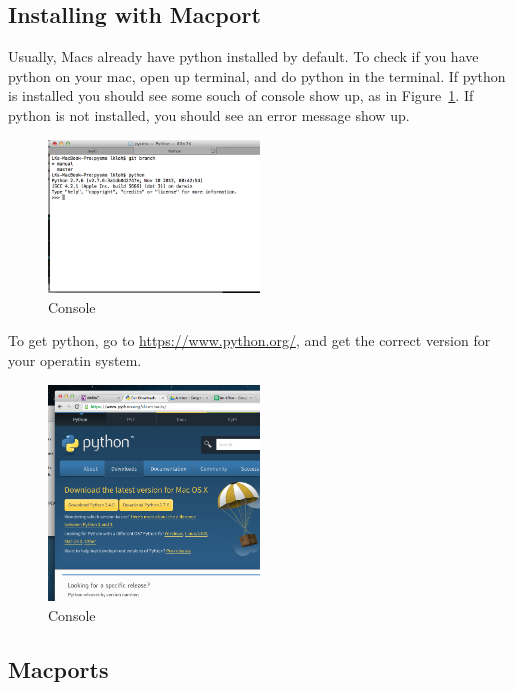 \documentclass[letterpaper,10pt]{article}
\begin{document}
\subsection{Installing with Macport}

Usually, Macs already have python installed by default. To check if you have python on your mac,
open up terminal, and do python in the terminal. If python is installed you should see some souch of console show up, as in Figure~\ref{fig:python_console}. If python is not installed, you should see an error message show up. 

\begin{figure}[h!]
  \centering
  \includegraphics[width=0.5\textwidth]{images/python_console}
  \caption{Console}
  \label{fig:python_console}
\end{figure}

To get python, go to \url{https://www.python.org/}, and get the correct version for your operatin system. 

\begin{figure}[h!]
  \centering
  \includegraphics[width=0.5\textwidth]{images/python_version}
  \caption{Console}
  \label{fig:python_version}
\end{figure}


\subsection{Macports}
\end{document}

